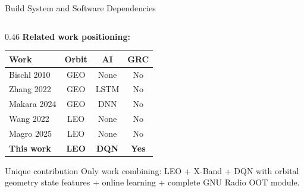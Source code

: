 \documentclass[aspectratio=169,10pt]{beamer}
\begin{document}
\begin{frame}[shrink=20]{Build System and Software Dependencies}
\begin{columns}[T]
\begin{column}{0.46\textwidth}
      \vspace{0.3em}
      \textbf{Related work positioning:}
      {\scriptsize
      \begin{tabular}{p{1.8cm}ccc}
        \toprule
        \textbf{Work} & \textbf{Orbit} & \textbf{AI} & \textbf{GRC}\\
        \midrule
        Bischl 2010     & GEO  & None    & No\\
        Zhang 2022      & GEO  & LSTM    & No\\
        Makara 2024     & GEO  & DNN     & No\\
        Wang 2022       & LEO  & None    & No\\
        Magro 2025      & LEO  & None    & No\\
        \textbf{This work} & \textbf{LEO} & \textbf{DQN} & \textbf{Yes}\\
        \bottomrule
      \end{tabular}}

      \vspace{0.2em}
      \begin{conceptbox}{Unique contribution}
        \scriptsize Only work combining: LEO + X-Band + DQN with orbital geometry state features + online learning + complete GNU Radio OOT module.
      \end{conceptbox}
    \end{column}
  \end{columns}
\end{frame}
\end{document}
